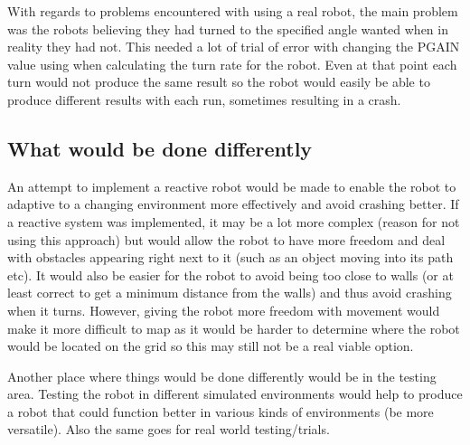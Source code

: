 \documentclass[a4paper,12pt]{article}
\begin{document}
\vspace{5mm}
\noindent With regards to problems encountered with using a real robot, the main problem was the robots believing they had turned to the specified angle wanted when in reality they had not. This needed a lot of trial of error with changing the PGAIN value using when calculating the turn rate for the robot. Even at that point each turn would not produce the same result so the robot would easily be able to produce different results with each run, sometimes resulting in a crash.

\subsection{What would be done differently}
\noindent An attempt to implement a reactive robot would be made to enable the robot to adaptive to a changing environment more effectively and avoid crashing better. If a reactive system was implemented, it may be a lot more complex (reason for not using this approach) but would allow the robot to have more freedom and deal with obstacles appearing right next to it (such as an object moving into its path etc). It would also be easier for the robot to avoid being too close to walls (or at least correct to get a minimum distance from the walls) and thus avoid crashing when it turns. However, giving the robot more freedom with movement would make it more difficult to map as it would be harder to determine where the robot would be located on the grid so this may still not be a real viable option.

\vspace{5mm}
\noindent Another place where things would be done differently would be in the testing area. Testing the robot in different simulated environments would help to produce a robot that could function better in various kinds of environments (be more versatile). Also the same goes for real world testing/trials.
\end{document}
